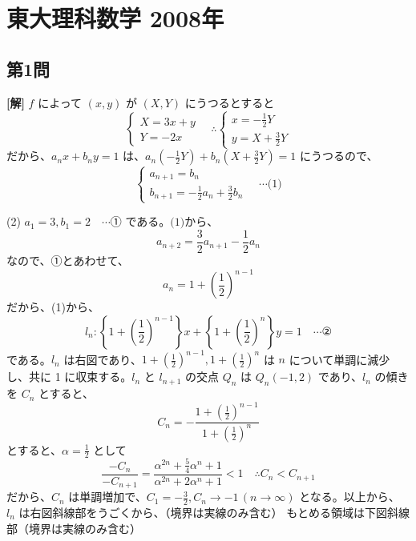 \documentclass[../main.tex]{subfiles}
\begin{document}
\section*{東大理科数学 2008年}

\subsection*{第1問}

\noindent
\textbf{[解]} $f$ によって $(x, y)$ が $(X, Y)$ にうつるとすると
\[
  \begin{cases}
    X = 3x + y \\
    Y = -2x
  \end{cases}
  \quad \therefore
  \begin{cases}
    x = -\frac{1}{2}Y \\
    y = X + \frac{3}{2}Y
  \end{cases}
\]
だから、$a_n x + b_n y = 1$ は、$a_n \left(-\frac{1}{2}Y\right) + b_n \left(X + \frac{3}{2}Y\right) = 1$ にうつるので、
\[
  \begin{cases}
    a_{n+1} = b_n \\
    b_{n+1} = -\frac{1}{2}a_n + \frac{3}{2}b_n
  \end{cases}
  \quad \cdots \text{(1)}
\]

\bigskip

\noindent
(2) $a_1 = 3, b_1 = 2 \quad \cdots \text{① である。(1)から、}$
\[
  a_{n+2} = \frac{3}{2}a_{n+1} - \frac{1}{2}a_n
\]
なので、①とあわせて、
\[
  a_n = 1 + \left(\frac{1}{2}\right)^{n-1}
\]
だから、(1)から、
\[
  l_n : \left\{1+\left(\frac{1}{2}\right)^{n-1}\right\}x + \left\{1+\left(\frac{1}{2}\right)^n\right\}y = 1 \quad \cdots \text{②}
\]
である。$l_n$ は右図であり、$1+\left(\frac{1}{2}\right)^{n-1}, 1+\left(\frac{1}{2}\right)^n$ は $n$ について単調に減少し、共に 1 に収束する。$l_n$ と $l_{n+1}$ の交点 $Q_n$ は $Q_n(-1, 2)$ であり、$l_n$ の傾きを $C_n$ とすると、
\[
  C_n = -\frac{1+\left(\frac{1}{2}\right)^{n-1}}{1+\left(\frac{1}{2}\right)^n}
\]
とすると、$\alpha = \frac{1}{2}$ として
\[
  \frac{-C_n}{-C_{n+1}} = \frac{\alpha^{2n} + \frac{5}{4}\alpha^n + 1}{\alpha^{2n} + 2\alpha^n + 1} < 1 \quad \therefore C_n < C_{n+1}
\]
だから、$C_n$ は単調増加で、$C_1 = -\frac{3}{2}, C_n \to -1 \, (n \to \infty)$ となる。以上から、
$l_n$ は右図斜線部をうごくから、（境界は実線のみ含む）
もとめる領域は下図斜線部（境界は実線のみ含む）
\end{document}

